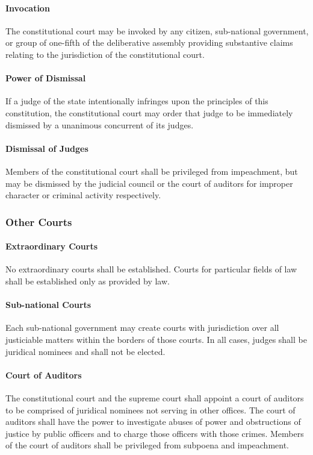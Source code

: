 \documentclass{article}
\begin{document}
\paragraph{Invocation}
The constitutional court may be invoked by any citizen, sub-national government, or group of one-fifth of the deliberative assembly providing substantive claims relating to the jurisdiction of the constitutional court.
\paragraph{Power of Dismissal}
If a judge of the state intentionally infringes upon the principles of this constitution, the constitutional court may order that judge to be immediately dismissed by a unanimous concurrent of its judges.
\paragraph{Dismissal of Judges}
Members of the constitutional court shall be privileged from impeachment, but may be dismissed by the judicial council or the court of auditors for improper character or criminal activity respectively.
\subsubsection{Other Courts}
\paragraph{Extraordinary Courts}
No extraordinary courts shall be established. Courts for particular fields of law shall be established only as provided by law.
\paragraph{Sub-national Courts}
Each sub-national government may create courts with jurisdiction over all justiciable matters within the borders of those courts. In all cases, judges shall be juridical nominees and shall not be elected.
\paragraph{Court of Auditors}
The constitutional court and the supreme court shall appoint a court of auditors to be comprised of juridical nominees not serving in other offices. The court of auditors shall have the power to investigate abuses of power and obstructions of justice by public officers and to charge those officers with those crimes. Members of the court of auditors shall be privileged from subpoena and impeachment.
\end{document}
